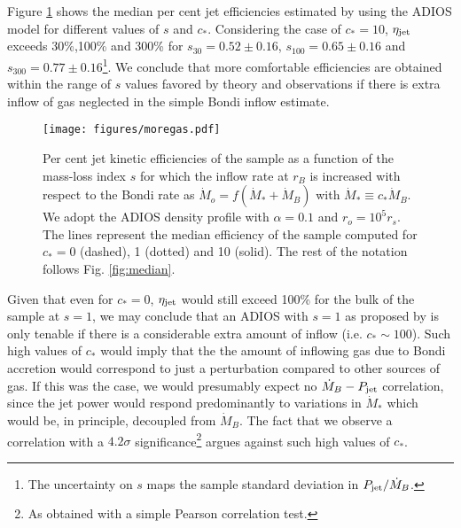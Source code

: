 \documentclass[useAMS,usenatbib]{mn2e}
\begin{document}
Figure \ref{fig:moregas} shows the median per cent jet efficiencies estimated by using the ADIOS model for different values of $s$ and $c_*$. Considering the case of $c_*=10$, $\eta_{\rm jet}$ exceeds 30\%,100\% and 300\% for $s_{30}=0.52 \pm 0.16$, $s_{100}=0.65 \pm 0.16$ and $s_{300}=0.77 \pm 0.16$\footnote{The uncertainty on $s$ maps the sample standard deviation in $P_{\rm jet}/\dot{M}_B$.}. We conclude that more comfortable efficiencies are obtained within the range of $s$ values favored by theory and observations if there is extra inflow of gas neglected in the simple Bondi inflow estimate. 

\begin{figure}
\centering
\texttt{[image: figures/moregas.pdf]}
\caption{Per cent jet kinetic efficiencies of the sample as a function of the mass-loss index $s$ for which the inflow rate at $r_B$ is increased with respect to the Bondi rate as $\dot{M}_o=f (\dot{M}_*+\dot{M}_B)$ with $\dot{M}_* \equiv c_* \dot{M}_B$. We adopt the ADIOS density profile with $\alpha=0.1$ and $r_o=10^5 r_s$. The lines represent the median efficiency of the sample computed for $c_* = 0$ (dashed), 1 (dotted) and 10 (solid). The rest of the notation follows Fig. \ref{fig:median}.}
\label{fig:moregas}
\end{figure}

Given that even for $c_*=0$, $\eta_{\rm jet}$ would still exceed 100\% for the bulk of the sample at $s=1$, we may conclude that an ADIOS with $s=1$ as proposed by \cite{Begelman12} is only tenable if there is a considerable extra amount of inflow (i.e. $c_* \sim 100$). 
Such high values of $c_*$ would imply that the the amount of inflowing gas due to Bondi accretion would correspond to just a perturbation compared to other sources of gas. If this was the case, we would presumably expect no $\dot{M}_B-P_{\rm jet}$ correlation, since the jet power would respond predominantly to variations in $\dot{M}_*$ which would be, in principle, decoupled from $\dot{M}_B$. The fact that we observe a correlation with a $4.2\sigma$ significance\footnote{As obtained with a simple Pearson correlation test.} argues against such high values of $c_*$. 
\end{document}

